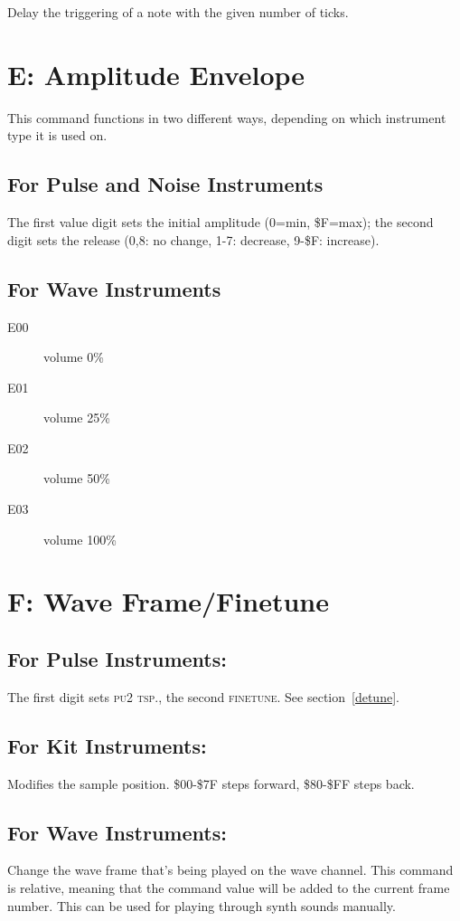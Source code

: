 Delay the triggering of a note with the given number of ticks.

\section{E: Amplitude Envelope}

This command functions in two different ways, depending on which instrument type it is used on.

\subsection{For Pulse and Noise Instruments}
The first value digit sets the initial amplitude (0=min, \$F=max); the second digit sets the release (0,8: no change, 1-7: decrease, 9-\$F: increase).

\subsection{For Wave Instruments}
\begin{description}
\item[E00] volume 0\%
\item[E01] volume 25\%
\item[E02] volume 50\%
\item[E03] volume 100\%
\end{description}

\section{F: Wave Frame/Finetune}

\subsection{For Pulse Instruments:}
The first digit sets \textsc{pu2 tsp.}, the second \textsc{finetune}.
See section~\ref{detune}.

\subsection{For Kit Instruments:}
Modifies the sample position. \$00-\$7F steps forward, \$80-\$FF steps back.

\subsection{For Wave Instruments:}
Change the wave frame that's being played on the wave channel. This command is relative, meaning that the command value will be added to the current frame number. This can be used for playing through synth sounds manually.

